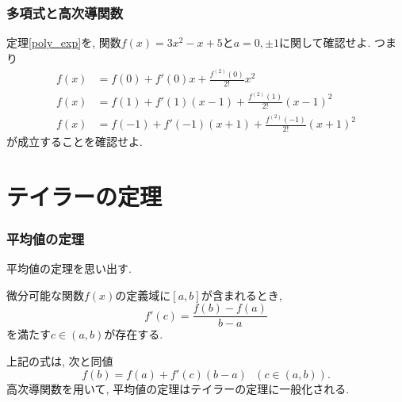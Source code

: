 \begin{frame}
\frametitle{多項式と高次導関数}

\begin{Prob}
定理\ref{poly_exp}を, 関数$f(x)=3x^2-x+5$と$a=0,\pm1$に関して確認せよ. つまり
\begin{align*}
f(x) & = f(0)+ f'(0)x + \frac{f^{(2)}(0)}{2!}x^2 \\
f(x) & = f(1)+ f'(1)(x-1) + \frac{f^{(2)}(1)}{2!}(x-1)^2 \\
f(x) & = f(-1)+ f'(-1)(x+1) + \frac{f^{(2)}(-1)}{2!}(x+1)^2 
\end{align*}
が成立することを確認せよ. 
\end{Prob}


\end{frame}

\section{テイラーの定理}

\begin{frame}

\frametitle{平均値の定理}


平均値の定理を思い出す. 
\begin{Thm}[平均値の定理]
微分可能な関数$f(x)$の定義域に$[a,b]$が含まれるとき, %
$$
f'(c)=\frac{f(b)-f(a)}{b-a}
$$
を満たす$c \in (a,b)$が存在する. 
\end{Thm}

上記の式は, 次と同値
$$
f(b)=f(a)+f'(c)(b-a) \ \ \ (c \in (a,b)). 
$$
高次導関数を用いて, 平均値の定理はテイラーの定理に一般化される. 

\end{frame}







